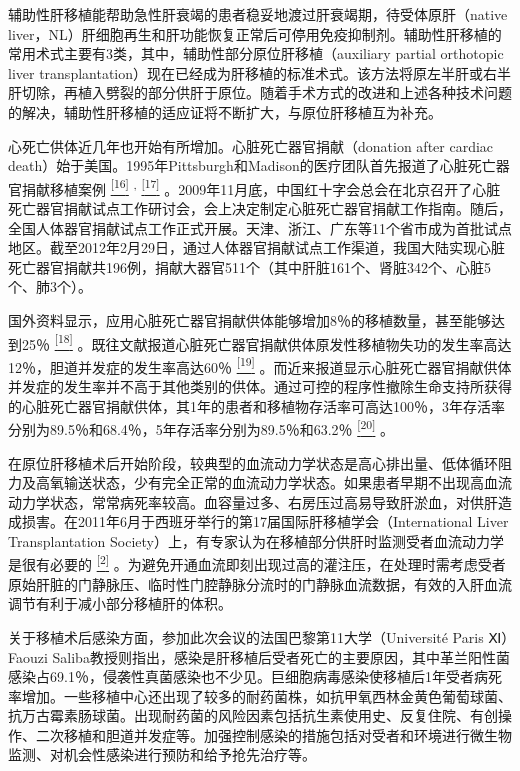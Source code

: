 辅助性肝移植能帮助急性肝衰竭的患者稳妥地渡过肝衰竭期，待受体原肝（native
liver，NL）肝细胞再生和肝功能恢复正常后可停用免疫抑制剂。辅助性肝移植的常用术式主要有3类，其中，辅助性部分原位肝移植（auxiliary
partial orthotopic liver
transplantation）现在已经成为肝移植的标准术式。该方法将原左半肝或右半肝切除，再植入劈裂的部分供肝于原位。随着手术方式的改进和上述各种技术问题的解决，辅助性肝移植的适应证将不断扩大，与原位肝移植互为补充。

心死亡供体近几年也开始有所增加。心脏死亡器官捐献（donation after cardiac
death）始于美国。1995年Pittsburgh和Madison的医疗团队首先报道了心脏死亡器官捐献移植案例
\protect\hyperlink{text00020.htmlux5cux23ch16-19}{\textsuperscript{{[}16{]}}}
\textsuperscript{,}
\protect\hyperlink{text00020.htmlux5cux23ch17-19}{\textsuperscript{{[}17{]}}}
。2009年11月底，中国红十字会总会在北京召开了心脏死亡器官捐献试点工作研讨会，会上决定制定心脏死亡器官捐献工作指南。随后，全国人体器官捐献试点工作正式开展。天津、浙江、广东等11个省市成为首批试点地区。截至2012年2月29日，通过人体器官捐献试点工作渠道，我国大陆实现心脏死亡器官捐献共196例，捐献大器官511个（其中肝脏161个、肾脏342个、心脏5个、肺3个）。

国外资料显示，应用心脏死亡器官捐献供体能够增加8％的移植数量，甚至能够达到25％
\protect\hyperlink{text00020.htmlux5cux23ch18-19}{\textsuperscript{{[}18{]}}}
。既往文献报道心脏死亡器官捐献供体原发性移植物失功的发生率高达12％，胆道并发症的发生率高达60％
\protect\hyperlink{text00020.htmlux5cux23ch19-19}{\textsuperscript{{[}19{]}}}
。而近来报道显示心脏死亡器官捐献供体并发症的发生率并不高于其他类别的供体。通过可控的程序性撤除生命支持所获得的心脏死亡器官捐献供体，其1年的患者和移植物存活率可高达100％，3年存活率分别为89.5％和68.4％，5年存活率分别为89.5％和63.2％
\protect\hyperlink{text00020.htmlux5cux23ch20-19}{\textsuperscript{{[}20{]}}}
。

在原位肝移植术后开始阶段，较典型的血流动力学状态是高心排出量、低体循环阻力及高氧输送状态，少有完全正常的血流动力学状态。如果患者早期不出现高血流动力学状态，常常病死率较高。血容量过多、右房压过高易导致肝淤血，对供肝造成损害。在2011年6月于西班牙举行的第17届国际肝移植学会（International
Liver Transplantation
Society）上，有专家认为在移植部分供肝时监测受者血流动力学是很有必要的
\protect\hyperlink{text00020.htmlux5cux23ch2-19}{\textsuperscript{{[}2{]}}}
。为避免开通血流即刻出现过高的灌注压，在处理时需考虑受者原始肝脏的门静脉压、临时性门腔静脉分流时的门静脉血流数据，有效的入肝血流调节有利于减小部分移植肝的体积。

关于移植术后感染方面，参加此次会议的法国巴黎第11大学（Université Paris
Ⅺ）Faouzi
Saliba教授则指出，感染是肝移植后受者死亡的主要原因，其中革兰阳性菌感染占69.1％，侵袭性真菌感染也不少见。巨细胞病毒感染使移植后1年受者病死率增加。一些移植中心还出现了较多的耐药菌株，如抗甲氧西林金黄色葡萄球菌、抗万古霉素肠球菌。出现耐药菌的风险因素包括抗生素使用史、反复住院、有创操作、二次移植和胆道并发症等。加强控制感染的措施包括对受者和环境进行微生物监测、对机会性感染进行预防和给予抢先治疗等。

